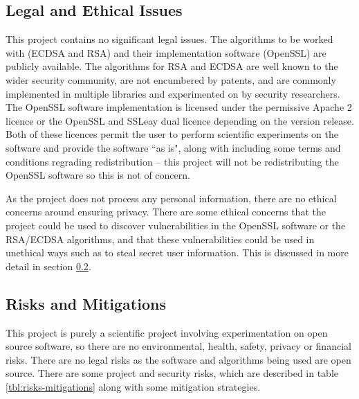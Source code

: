\documentclass[a4paper,oneside,11pt]{article}
\begin{document}


\subsection{Legal and Ethical Issues}
\label{sec:legal-and-ethical}

This project contains no significant legal issues. The algorithms to be worked
with (ECDSA and RSA) and their implementation software (OpenSSL) are publicly
available. The algorithms for RSA and ECDSA are well known to the wider
security community, are not encumbered by patents, and are commonly implemented
in multiple libraries and experimented on by security researchers. The OpenSSL
software implementation is licensed under the permissive Apache 2 licence or
the OpenSSL and SSLeay dual licence depending on the version release. Both of
these licences permit the user to perform scientific experiments on the
software and provide the software ``as is", along with including some terms and
conditions regrading redistribution -- this project will not be redistributing
the OpenSSL software so this is not of concern.

As the project does not process any personal information, there are no ethical
concerns around ensuring privacy. There are some ethical concerns that the
project could be used to discover vulnerabilities in the OpenSSL software or
the RSA/ECDSA algorithms, and that these vulnerabilities could be used in
unethical ways such as to steal secret user information. This is discussed in
more detail in section \ref{sec:risks-and-mitigations}.



\subsection{Risks and Mitigations}
\label{sec:risks-and-mitigations}

This project is purely a scientific project involving experimentation on open
source software, so there are no environmental, health, safety, privacy or
financial risks. There are no legal risks as the software and algorithms being
used are open source. There are some project and security risks, which are
described in table \ref{tbl:risks-mitigations} along with some mitigation
strategies.
\end{document}
